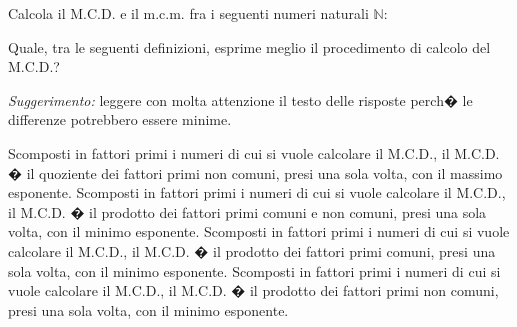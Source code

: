 \documentclass[11pt, a4paper, answers]{exam}
\begin{document}
\begin{questions}
\begin{parts}
\begin{solution}
\end{solution}

\end{parts}

\addpoints
\question[10]
Calcola il M.C.D. e il m.c.m. fra i seguenti numeri naturali \(\mathbb{N}\):

\begin{multicols}{2}
\end{multicols}

\addpoints
\question [5]Quale, tra le seguenti definizioni, esprime meglio il procedimento di calcolo del M.C.D.?

\emph{Suggerimento:} leggere con molta attenzione il testo delle risposte perch� le differenze potrebbero essere minime.
\begin{choices}
 \choice Scomposti in fattori primi i numeri di cui si vuole calcolare il M.C.D., il M.C.D. � il quoziente dei fattori primi non comuni, presi una sola volta, con il massimo esponente.
 \choice Scomposti in fattori primi i numeri di cui si vuole calcolare il M.C.D., il M.C.D. � il prodotto dei fattori primi comuni e non comuni, presi una sola volta, con il minimo esponente.
 \CorrectChoice Scomposti in fattori primi i numeri di cui si vuole calcolare il M.C.D., il M.C.D. � il prodotto dei fattori primi comuni, presi una sola volta, con il minimo esponente.
 \choice Scomposti in fattori primi i numeri di cui si vuole calcolare il M.C.D., il M.C.D. � il prodotto dei fattori primi non comuni, presi una sola volta, con il minimo esponente.
\end{choices}
\vspace{5pt}


\end{questions}
\end{document}
